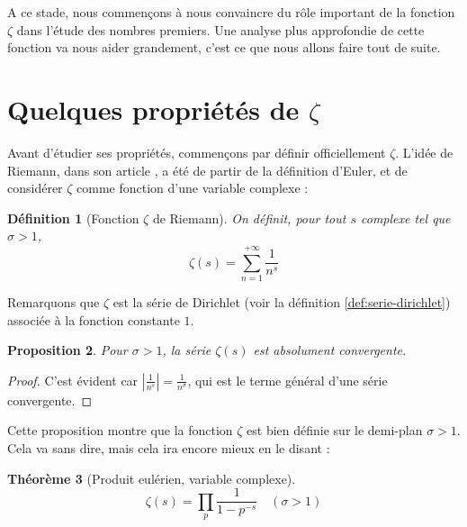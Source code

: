 \documentclass[french]{report}
\newtheorem{theorem}{Théorème}[section]
\newtheorem{definition}[theorem]{Définition}
\newtheorem{proposition}[theorem]{Proposition}
\begin{document}
A ce stade, nous commençons à nous convaincre du rôle important de la fonction $\zeta$ dans l'étude des nombres premiers. Une analyse plus approfondie de cette fonction va nous aider grandement, c'est ce que nous allons faire tout de suite.

\section{Quelques propriétés de $\zeta$}

Avant d'étudier ses propriétés, commençons par définir officiellement $\zeta$. L'idée de Riemann, dans son article \cite{riemann}, a été de partir de la définition d'Euler, et de considérer $\zeta$ comme fonction d'une variable complexe :

\begin{definition}[Fonction $\zeta$ de Riemann]\label{def:zeta-definition}
  On définit, pour tout $s$ complexe tel que $\sigma > 1$,
  \[ \zeta(s) = \sum_{n=1}^{+\infty}\frac{1}{n^s} \]
\end{definition}

Remarquons que $\zeta$ est la série de Dirichlet (voir la définition \ref{def:serie-dirichlet}) associée à la fonction constante $1$.

\begin{proposition}
  Pour $\sigma > 1$, la série $\zeta(s)$ est absolument convergente.
\end{proposition}

\begin{proof}
  C'est évident car $|\frac{1}{n^s}| = \frac{1}{n^{\sigma}}$, qui est le terme général d'une série convergente.
\end{proof}

Cette proposition montre que la fonction $\zeta$ est bien définie sur le demi-plan $\sigma > 1$.
\\

Cela va sans dire, mais cela ira encore mieux en le disant :

\begin{theorem}[Produit eulérien, variable complexe]\label{thm:produit-eulerien-complexe}
  \[ \zeta(s) = \prod_p\frac{1}{1-p^{-s}}\quad(\sigma>1)\]
\end{theorem}
\end{document}
